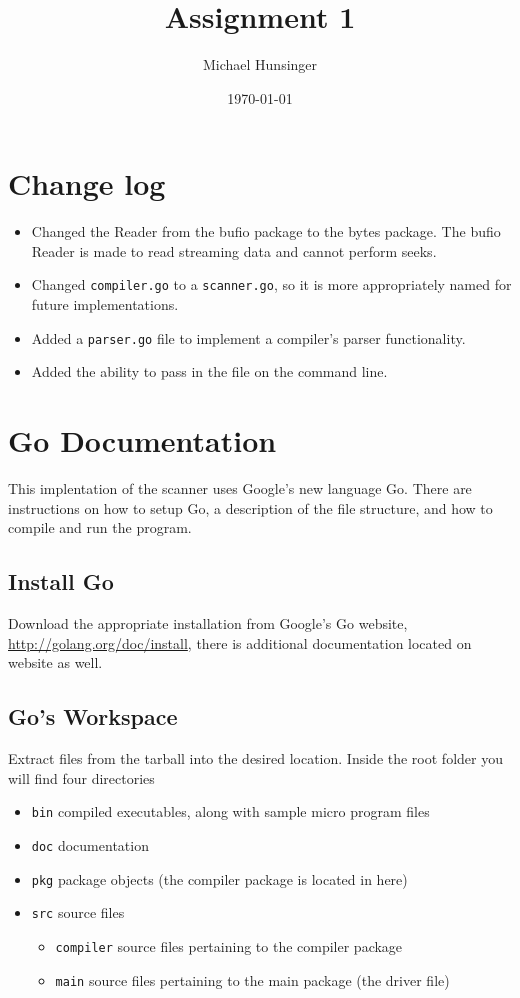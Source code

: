 \documentclass[a4paper]{article}
\author{Michael Hunsinger}
\date{\today}
\title{Assignment 1}
\begin{document}
\maketitle

\section{Change log}
\label{sec-1}
\begin{itemize}
\item Changed the Reader from the bufio package to the bytes package. The
bufio Reader is made to read streaming data and cannot perform seeks.
\item Changed \verb~compiler.go~ to a \verb~scanner.go~, so it is more appropriately
named for future implementations.
\item Added a \verb~parser.go~ file to implement a compiler's parser functionality.
\item Added the ability to pass in the file on the command line.
\end{itemize}

\section{Go Documentation}
\label{sec-2}
This implentation of the scanner uses Google's new language Go. There are
instructions on how to setup Go, a description of the file structure, and
how to compile and run the program.

\subsection{Install Go}
\label{sec-2-1}
Download the appropriate installation from Google's Go website,
\url{http://golang.org/doc/install}, there is additional documentation located
on website as well.

\subsection{Go's Workspace}
\label{sec-2-2}
Extract files from the tarball into the desired location. Inside the root
folder you will find four directories
\begin{itemize}
\item \verb~bin~ compiled executables, along with sample micro program files
\item \verb~doc~ documentation
\item \verb~pkg~ package objects (the compiler package is located in here)
\item \verb~src~ source files
\begin{itemize}
\item \verb~compiler~ source files pertaining to the compiler package
\item \verb~main~ source files pertaining to the main package (the driver file)
\end{itemize}
\end{itemize}
\end{document}

